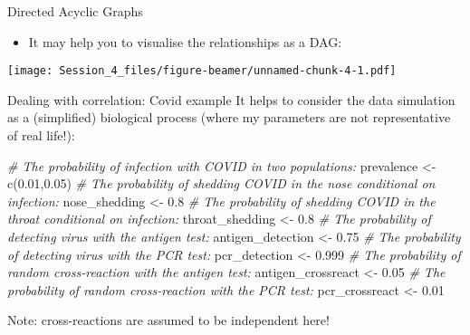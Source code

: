 \documentclass[
  ignorenonframetext,
  aspectratio=169,
]{beamer}
\newenvironment{Shaded}{\begin{snugshade}}{\end{snugshade}}
\newcommand{\CommentTok}[1]{\textcolor[rgb]{0.56,0.35,0.01}{\textit{#1}}}
\newcommand{\FloatTok}[1]{\textcolor[rgb]{0.00,0.00,0.81}{#1}}
\newcommand{\FunctionTok}[1]{\textcolor[rgb]{0.00,0.00,0.00}{#1}}
\newcommand{\NormalTok}[1]{#1}
\newcommand{\OtherTok}[1]{\textcolor[rgb]{0.56,0.35,0.01}{#1}}
\providecommand{\tightlist}{%
  \setlength{\itemsep}{0pt}\setlength{\parskip}{0pt}}
\begin{document}
\begin{frame}{Directed Acyclic Graphs}
\protect\hypertarget{directed-acyclic-graphs}{}
\begin{itemize}
\tightlist
\item
  It may help you to visualise the relationships as a DAG:
\end{itemize}

\scriptsize\texttt{[image: Session\_4\_files/figure-beamer/unnamed-chunk-4-1.pdf]}
\normalsize
\end{frame}

\begin{frame}[fragile]{Dealing with correlation: Covid example}
\protect\hypertarget{dealing-with-correlation-covid-example}{}
It helps to consider the data simulation as a (simplified) biological
process (where my parameters are not representative of real life!):

\scriptsize

\begin{Shaded}
\begin{Highlighting}[]
\CommentTok{\# The probability of infection with COVID in two populations:}
\NormalTok{prevalence }\OtherTok{\textless{}{-}} \FunctionTok{c}\NormalTok{(}\FloatTok{0.01}\NormalTok{,}\FloatTok{0.05}\NormalTok{)}
\CommentTok{\# The probability of shedding COVID in the nose conditional on infection:}
\NormalTok{nose\_shedding }\OtherTok{\textless{}{-}} \FloatTok{0.8}
\CommentTok{\# The probability of shedding COVID in the throat conditional on infection:}
\NormalTok{throat\_shedding }\OtherTok{\textless{}{-}} \FloatTok{0.8}
\CommentTok{\# The probability of detecting virus with the antigen test:}
\NormalTok{antigen\_detection }\OtherTok{\textless{}{-}} \FloatTok{0.75}
\CommentTok{\# The probability of detecting virus with the PCR test:}
\NormalTok{pcr\_detection }\OtherTok{\textless{}{-}} \FloatTok{0.999}
\CommentTok{\# The probability of random cross{-}reaction with the antigen test:}
\NormalTok{antigen\_crossreact }\OtherTok{\textless{}{-}} \FloatTok{0.05}
\CommentTok{\# The probability of random cross{-}reaction with the PCR test:}
\NormalTok{pcr\_crossreact }\OtherTok{\textless{}{-}} \FloatTok{0.01}
\end{Highlighting}
\end{Shaded}

\normalsize

\pause

Note: cross-reactions are assumed to be independent here!
\end{frame}
\end{document}
